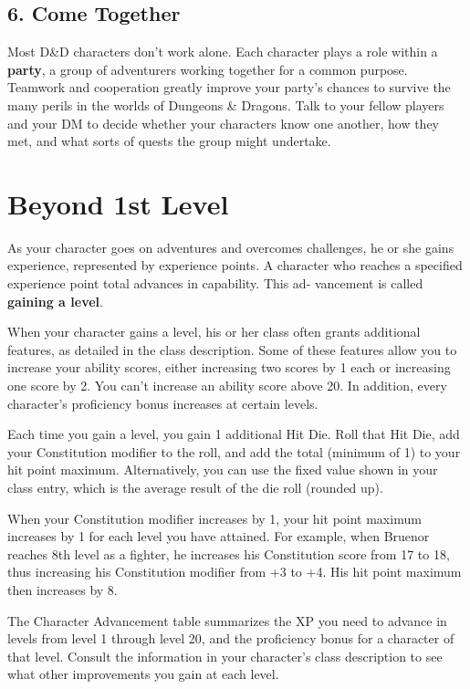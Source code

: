 \subsection{6. Come Together}
Most D\&D characters don’t work alone. Each character plays a role within a \textbf{party}, a group of adventurers working together for a common purpose. Teamwork and cooperation greatly improve your party’s chances to survive the many perils in the worlds of Dungeons \& Dragons. Talk to your fellow players and your DM to decide whether your characters know one another, how they met, and what sorts of quests the group might undertake.

\section{Beyond 1st Level}
As your character goes on adventures and overcomes challenges, he or she gains experience, represented by experience points. A character who reaches a specified experience point total advances in capability. This ad- vancement is called \textbf{gaining a level}.

When your character gains a level, his or her class often grants additional features, as detailed in the class description. Some of these features allow you to increase your ability scores, either increasing two scores by 1 each or increasing one score by 2. You can’t increase an ability score above 20. In addition, every character’s proficiency bonus increases at certain levels.

Each time you gain a level, you gain 1 additional Hit Die. Roll that Hit Die, add your Constitution modifier to the roll, and add the total (minimum of 1) to your hit point maximum. Alternatively, you can use the fixed value shown in your class entry, which is the average result of the die roll (rounded up).

When your Constitution modifier increases by 1, your hit point maximum increases by 1 for each level you have attained. For example, when Bruenor reaches 8th level as a fighter, he increases his Constitution score from 17 to 18, thus increasing his Constitution modifier from +3 to +4. His hit point maximum then increases by 8.

The Character Advancement table summarizes the XP you need to advance in levels from level 1 through level 20, and the proficiency bonus for a character of that level. Consult the information in your character’s class description to see what other improvements you gain at each level.

